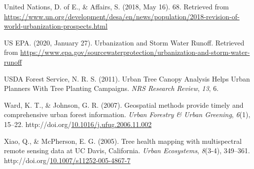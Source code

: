 \documentclass[12pt,twoside]{reedthesis}
\newlength{\cslhangindent}
\newenvironment{CSLReferences}[2] %
 {%
  \setlength{\parindent}{0pt}
  \ifodd #1 \everypar{\setlength{\hangindent}{\cslhangindent}}\ignorespaces\fi
  \ifnum #2 > 0
  \setlength{\parskip}{#2\baselineskip}
  \fi
 }%
 {}
\begin{document}
\begin{CSLReferences}{1}{0}
\leavevmode{}%
United Nations, D. of E., \& Affairs, S. (2018, May 16). 68. Retrieved from \url{https://www.un.org/development/desa/en/news/population/2018-revision-of-world-urbanization-prospects.html}

\leavevmode{}%
US EPA. (2020, January 27). Urbanization and Storm Water Runoff. Retrieved from \url{https://www.epa.gov/sourcewaterprotection/urbanization-and-storm-water-runoff}

\leavevmode{}%
USDA Forest Service, N. R. S. (2011). Urban Tree Canopy Analysis Helps Urban Planners With Tree Planting Campaigns. \emph{NRS Research Review}, \emph{13}, 6.

\leavevmode{}%
Ward, K. T., \& Johnson, G. R. (2007). Geospatial methods provide timely and comprehensive urban forest information. \emph{Urban Forestry \& Urban Greening}, \emph{6}(1), 15--22. http://doi.org/\href{https://doi.org/10.1016/j.ufug.2006.11.002}{10.1016/j.ufug.2006.11.002}

\leavevmode{}%
Xiao, Q., \& McPherson, E. G. (2005). Tree health mapping with multispectral remote sensing data at UC Davis, California. \emph{Urban Ecosystems}, \emph{8}(3-4), 349--361. http://doi.org/\href{https://doi.org/10.1007/s11252-005-4867-7}{10.1007/s11252-005-4867-7}

\end{CSLReferences}

\end{document}
